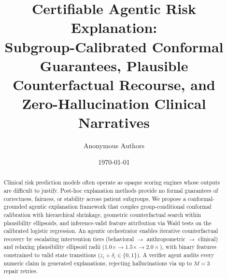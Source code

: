 \documentclass[11pt,a4paper]{article}
\title{Certifiable Agentic Risk Explanation:\\
Subgroup-Calibrated Conformal Guarantees, Plausible Counterfactual Recourse, and Zero-Hallucination Clinical Narratives}
\author{Anonymous Authors}
\date{\today}
\theoremstyle{plain}
\begin{document}
\maketitle

\begin{abstract}
Clinical risk prediction models often operate as opaque scoring engines whose outputs are difficult to justify. Post-hoc explanation methods provide no formal guarantees of correctness, fairness, or stability across patient subgroups. We propose a conformal-grounded agentic explanation framework that couples group-conditional conformal calibration with hierarchical shrinkage, geometric counterfactual search within plausibility ellipsoids, and inference-valid feature attribution via Wald tests on the calibrated logistic regression. An agentic orchestrator enables iterative counterfactual recovery by escalating intervention tiers (behavioral $\to$ anthropometric $\to$ clinical) and relaxing plausibility ellipsoid radii ($1.0\times \to 1.5\times \to 2.0\times$), with binary features constrained to valid state transitions ($z_i + \delta_i \in \{0,1\}$). A verifier agent audits every numeric claim in generated explanations, rejecting hallucinations via up to $M=3$ repair retries.


\end{abstract}
\end{document}
